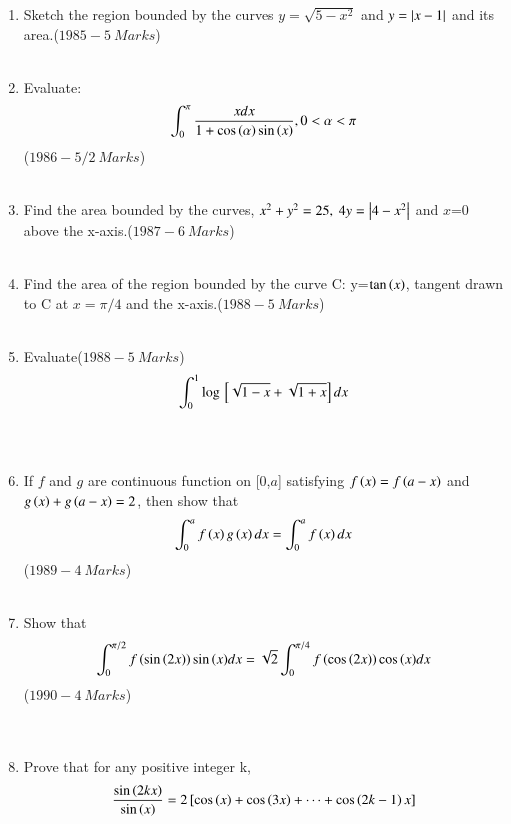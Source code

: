 \documentclass[journal]{IEEEtran}
\begin{document}
\begin{enumerate}
		     \item Sketch the region bounded by the curves $y=\sqrt{5-x^2}$ and $y=\left\vert x-1\right\vert$ and its\\ area.\hfill($1985-5\ Marks$)\\\\
		     \item Evaluate:\begin{align*}
		         \int_{0}^{\pi}\frac{xdx}{1+\cos{\ensuremath{\left(\alpha\right)}}\sin{\ensuremath{\left(x\right)}}},0<\alpha<\pi\end{align*}\hfill($1986-5/2\ Marks$)\\\\
			 \item Find the area bounded by the curves, $x^2+y^2=25,\ 4y=\left\vert4-x^2\right\vert$ and $x$=0 above the x-axis.\hfill($1987-6\ Marks$)\\\\
			 \item Find the area of the region bounded by the curve C: y=$\tan{\ensuremath{\left(x\right)}}$, tangent drawn to C at $x=\pi/4$ and the x-axis.\hfill($1988-5\ Marks$)\\\\
			 \item Evaluate\hfill($1988-5\ Marks$)\\ \begin{align*}\int_{0}^{1}\log{}\left[\sqrt{1-x}+\sqrt{1+x}\right]dx\end{align*}\\\\
				 \item If $f$ and $g$ are continuous function on [0,$a$] satisfying $f\left(x\right)=f\left(a-x\right)$ and\\$g\left(x\right)+g\left(a-x\right)=2$, then show that \begin{align*}\int_{0}^{a}f\left(x\right)g\left(x\right)dx = \int_{0}^{a}f\left(x\right)dx\end{align*}\hfill($1989-4\ Marks$)\\\\
			 \item Show that \begin{align*}\int_{0}^{\pi/2}f\left(\sin{\ensuremath{\left(2x\right)}}\right)\sin{\ensuremath{\left(x\right)}}dx=\sqrt{2}\int_{0}^{\pi/4}f\left(\cos{\ensuremath{\left(2x\right)}}\right)\cos{\ensuremath{\left(x\right)}}dx\end{align*}\hfill($1990-4\ Marks$)\\\\\\
			 \item Prove that for any positive integer k,
				 \begin{align*} \frac{\sin{\brak{2kx}}}{\sin{\brak{x}}}=2\sbrak{\cos{\brak{x}}+\cos{\brak{3x}}+\cdots+\cos{\brak{2k-1}x}}

\end{align*}
\end{enumerate}
\end{document}
